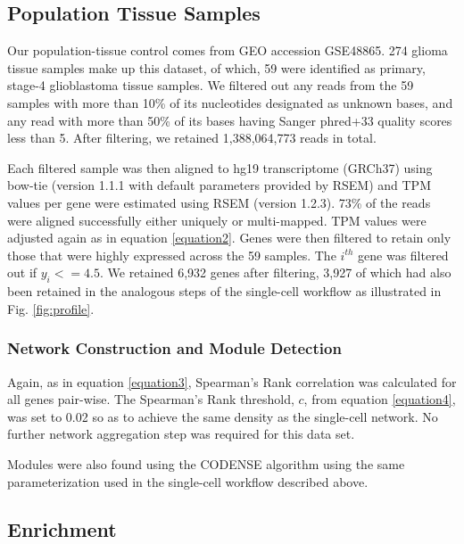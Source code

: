 \documentclass[10pt,letterpaper]{article}
\begin{document}
\subsection{Population Tissue Samples}
Our population-tissue control comes from GEO accession GSE48865. 274 glioma tissue samples make up this dataset, of which, 59 were identified as primary, stage-4 glioblastoma tissue samples. We filtered out any reads from the 59 samples with more than 10\% of its nucleotides designated as unknown bases, and any read with more than 50\% of its bases having Sanger phred+33 quality scores less than 5. After filtering, we retained 1,388,064,773 reads in total. 

Each filtered sample was then aligned to hg19 transcriptome (GRCh37) using bow-tie (version 1.1.1 with default parameters provided by RSEM) and TPM values per gene were estimated using RSEM (version 1.2.3). 73\% of the reads were aligned successfully either uniquely or multi-mapped. 
TPM values were adjusted again as in equation \ref{equation2}. Genes were then filtered to retain only those that were highly expressed across the 59 samples. The $i^{th}$ gene was filtered out if $y_{i} <= 4.5$. We retained 6,932 genes after filtering, 3,927 of which had also been retained in the analogous steps of the single-cell workflow as illustrated in Fig. \ref{fig:profile}.


\subsubsection{Network Construction and Module Detection}

Again, as in equation \ref{equation3}, Spearman’s Rank correlation was calculated for all genes pair-wise. The Spearman's Rank threshold, $c$, from equation \ref{equation4}, was set to 0.02 so as to achieve the same density as the single-cell network. No further network aggregation step was required for this data set. 

Modules were also found using the CODENSE algorithm using the same parameterization used in the single-cell workflow described above.

\subsection{Enrichment}
\end{document}
